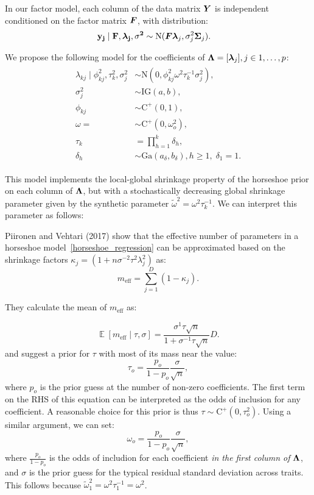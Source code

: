 \documentclass[11pt]{amsart}
\newcommand*{\B}[1]{\ifmmode\bm{#1}\else\textbf{#1}\fi}
\DeclareMathOperator{\E}{\mathbb{E}}
\begin{document}
In our factor model, each column of the data matrix $\B Y$ is independent conditioned on the factor matrix $\B F$, with distribution:
\begin{align*}
\bf{y}_j \mid \B{F},\B{\lambda}_j,\sigma^2 &\sim \mbox{N}(\B{F}\B{\lambda}_j, \sigma^2_j\B{\Sigma}_j).
\end{align*}

We propose the following model  for the coefficients of $\B\Lambda = [\B{\lambda}_j], j \in 1,\dots,p$:
\begin{align}
\begin{split}
\label{horseshoe_factor}
\lambda_{kj} \mid \phi^2_{kj}, \tau^2_k, \sigma^2_j &\sim \mbox{N}(0,\phi^2_{kj}\omega^2\tau^{-1}_k \sigma^2_j), \\
\sigma^2_j &\sim \mbox{IG}(a,b), \\
\phi_{kj} &\sim \mbox{C}^+(0,1), \\
\omega = &\sim \mbox{C}^+(0,\omega^2_o), \\
\tau_k &= \prod\limits_{h=1}^k \delta_h, \\
\delta_h &\sim \mbox{Ga}(a_\delta,b_\delta), h \geq 1, \; \delta_1 = 1.
\end{split}
\end{align}

This model implements the local-global shrinkage property of the horseshoe prior on each column of $\B \Lambda$, but with a stochastically decreasing global shrinkage parameter given by the synthetic parameter $\tilde{\omega}^2 = \omega^2\tau^{-1}_k$. We can interpret this parameter as follows:

Piironen and Vehtari (2017) show that the effective number of parameters in a horseshoe model~\ref{horseshoe_regression} can be approximated based on the shrinkage factors $\kappa_j = (1 + n\sigma^{-2}\tau^2\lambda_j^2)$ as:
$$m_{\mbox{eff}} = \sum \limits_{j=1}^D (1-\kappa_j).$$

\noindent They calculate the mean of $m_{\mbox{eff}}$ as:

$$\E [m_{\mbox{eff}} \mid \tau,\sigma] = \frac{\sigma^{1}\tau\sqrt{n}}{1 + \sigma^{-1}\tau\sqrt{n}}D.$$
\noindent and suggest a prior for $\tau$ with most of its mass near the value:
$$\tau_o = \frac{p_o}{1-p_o} \frac{\sigma}{\sqrt{n}},$$
\noindent where $p_o$ is the prior guess at the number of non-zero coefficients. The first term on the RHS of this equation can be interpreted as the odds of inclusion for any coefficient. A reasonable choice for this prior is thus $\tau \sim \mbox{C}^+(0,\tau^2_o)$. Using a similar argument, we can set:
$$\omega_o = \frac{p_o}{1-p_o} \frac{\sigma}{\sqrt{n}},$$
\noindent where $\frac{p_o}{1-p_o}$ is the odds of includion for each coefficient \textit{in the first column of} $\B\Lambda$, and $\sigma$ is the prior guess for the typical residual standard deviation across traits. This follows because $\tilde{\omega}^2_1 = \omega^2\tau^{-1}_1 = \omega^2$.
\end{document}

